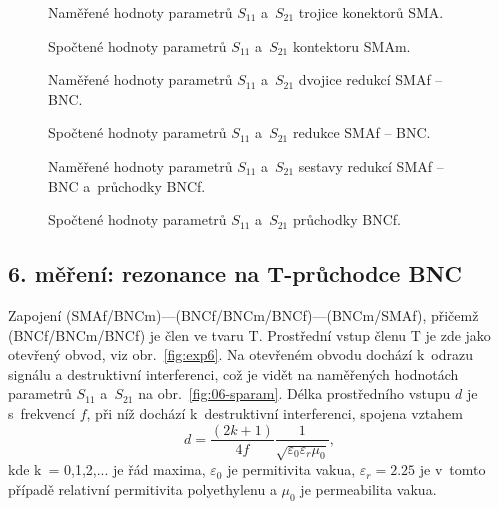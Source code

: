 \documentclass{protokol}
\newcommand\sparam{S}
\newcommand\male{m}
\newcommand\female{f}
\newcommand\connector[2]{#1 -- #2}
\begin{document}
\begin{figure}[p]
	\centering
	
	
	\caption{Naměřené hodnoty parametrů $\sparam_{11}$ a~$\sparam_{21}$
		trojice konektorů SMA.}
	\label{fig:03-sparam}
\end{figure}

\begin{figure}[p]
	\centering
	
	
	\caption{Spočtené hodnoty parametrů $\sparam_{11}$ a~$\sparam_{21}$
		kontektoru SMA\male.}
	\label{fig:03-result-sparam}
\end{figure}

\begin{figure}[p]
	\centering
	
	
	\caption{Naměřené hodnoty parametrů $\sparam_{11}$ a~$\sparam_{21}$
		dvojice redukcí \connector{SMA\female}{BNC}.}
	\label{fig:04-sparam}
\end{figure}

\begin{figure}[p]
	\centering
	
	
	\caption{Spočtené hodnoty parametrů $\sparam_{11}$ a~$\sparam_{21}$
		redukce \connector{SMA\female}{BNC}.}
	\label{fig:04-result-sparam}
\end{figure}

\begin{figure}[p]
	\centering
	
	
	\caption{Naměřené hodnoty parametrů $\sparam_{11}$ a~$\sparam_{21}$
		sestavy redukcí \connector{SMA\female}{BNC} a~průchodky BNC\female.}
	\label{fig:05-sparam}
\end{figure}

\begin{figure}[p]
	\centering
	
	
	\caption{Spočtené hodnoty parametrů $\sparam_{11}$ a~$\sparam_{21}$
		průchodky BNC\female.}
	\label{fig:05-result-sparam}
\end{figure}

\clearpage
\subsection{6. měření: rezonance na T-průchodce BNC}
\newcommand\freelen{d}
Zapojení (SMAf/BNCm)---(BNCf/BNCm/BNCf)---(BNCm/SMAf),
přičemž (BNCf/BNCm/BNCf) je člen ve tvaru T.
Prostřední vstup členu T je zde jako otevřený obvod, viz obr.~\ref{fig:exp6}.
Na otevřeném obvodu dochází k~odrazu signálu a destruktivní interferenci, což
je vidět na naměřených hodnotách parametrů $\sparam_{11}$ a~$\sparam_{21}$ na
obr.~\ref{fig:06-sparam}.
Délka prostředního vstupu $d$ je s~frekvencí $f$,
při níž dochází k~destruktivní interferenci, spojena vztahem
\begin{equation}
	d = \frac{(2k+1)}{4f} \frac{1}{\sqrt{\varepsilon_0 \varepsilon_r \mu_0}},
	\label{eq:resonance-length}
\end{equation}
kde k~= 0,1,2,... je řád maxima, $\varepsilon_0$ je permitivita vakua,
$\varepsilon_r = \num{2.25}$ je v~tomto případě relativní permitivita polyethylenu
a $\mu_0$ je permeabilita vakua.
\end{document}
